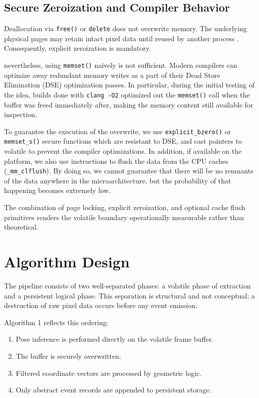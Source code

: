 \documentclass[conference]{IEEEtran}
\begin{document}
\subsection{Secure Zeroization and Compiler Behavior}
Deallocation via \texttt{free()} or \texttt{delete} does not overwrite memory. The underlying physical pages may retain intact pixel data until reused by another process \cite{b22}. Consequently, explicit zeroization is mandatory.

nevertheless, using \texttt{memset()} naively is not sufficient. Modern compilers can optimize away redundant memory writes as a part of their Dead Store Elimination (DSE) optimization passes. In particular, during the initial testing of the idea, builds done with \texttt{clang -O2} optimized out the \texttt{memset()} call when the buffer was freed immediately after, making the memory content still available for inspection.

To guarantee the execution of the overwrite, we use \texttt{explicit\_bzero()} or \texttt{memset\_s()} secure functions which are resistant to DSE, and cast pointers to volatile to prevent the compiler optimizations. In addition, if available on the platform, we also use instructions to flush the data from the CPU caches (\texttt{\_mm\_clflush}). By doing so, we cannot guarantee that there will be no remnants of the data anywhere in the microarchitecture, but the probability of that happening becomes extremely low. 

The combination of page locking, explicit zeroization, and optional cache flush primitives renders the volatile boundary operationally measurable rather than theoretical.

\section{Algorithm Design}

The pipeline consists of two well-separated phases: a volatile phase of extraction and a persistent logical phase. This separation is structural and not conceptual; a destruction of raw pixel data occurs before any event emission.

Algorithm 1 reflects this ordering:
\begin{enumerate}
    \item Pose inference is performed directly on the volatile frame buffer.
    \item The buffer is securely overwritten.
    \item Filtered coordinate vectors are processed by geometric logic.
    \item Only abstract event records are appended to persistent storage.
\end{enumerate}
\end{document}
